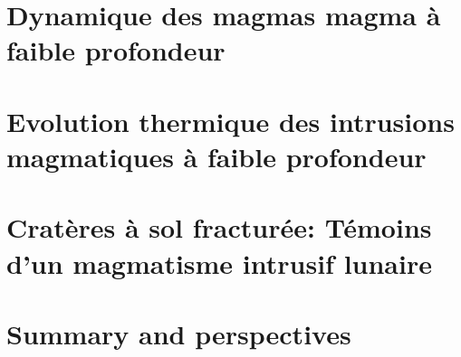 \documentclass[a4paper,12pt,twoside]{ThesisStyle}
\begin{document}


\dominitoc
\setcounter{tocdepth}{2}


\cleardoublepage



\cleardoublepage

\tableofcontents

\mainmatter

\setcounter{chapter}{-1}
\pagestyle{empty}



\part{Dynamique des magmas magma à faible profondeur}
\pagestyle{fancy}




\part{Evolution   thermique  des   intrusions  magmatiques   à faible
  profondeur}




\part{Cratères à  sol  fracturée: Témoins  d'un  magmatisme  intrusif
  lunaire}

% 
% 

\part{Summary and perspectives}
% 



% 
% 

% 

% 
% 
\end{document}
